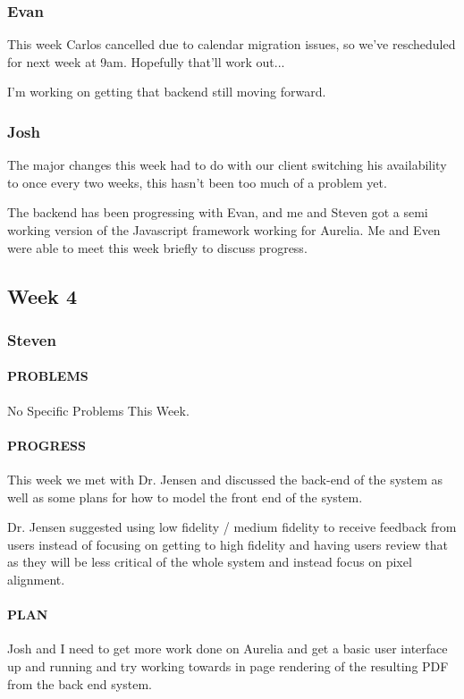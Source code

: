 \documentclass[onecolumn, draftclsnofoot,10pt, compsoc]{IEEEtran}
\begin{document}
	\subsubsection{Evan}
	
	This week Carlos cancelled due to calendar migration issues, so we've rescheduled for next week at 9am. Hopefully that'll work out...
	
	I'm working on getting that backend still moving forward. 
	
	\subsubsection{Josh}
	The major changes this week had to do with our client switching his availability to once every two weeks, this hasn't been too much of a problem yet. 
	
	The backend has been progressing with Evan, and me and Steven got a semi working version of the Javascript framework working for Aurelia. Me and Even were able to meet this week briefly to discuss progress.
\subsection{Week 4}
	\subsubsection{Steven}
	\paragraph{PROBLEMS}
	No Specific Problems This Week.
	
	\paragraph{PROGRESS}
	This week we met with Dr. Jensen and discussed the back-end of the system as well as some plans for how to model the front end of the system.
	
	Dr. Jensen suggested using low fidelity / medium fidelity to receive feedback from users instead of focusing on getting to high fidelity and having users review that as they will be less critical of the whole system and instead focus on pixel alignment.
	
	\paragraph{PLAN}
	Josh and I need to get more work done on Aurelia and get a basic user interface up and running and try working towards in page rendering of the resulting PDF from the back end system.
	
\end{document}
